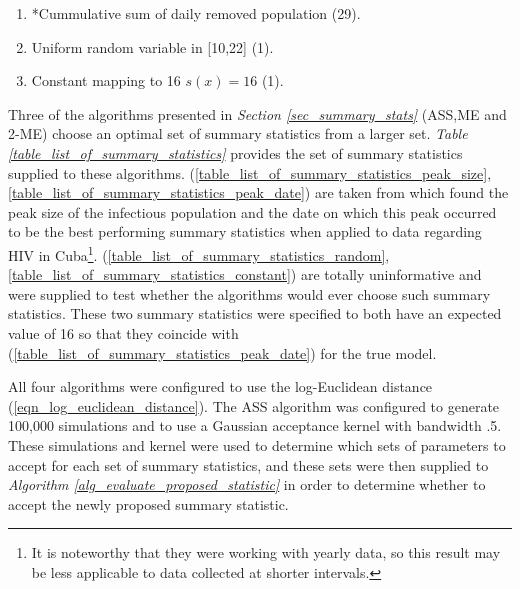 \documentclass[11pt,a4paper]{article}
\theoremstyle{break}
\begin{document}
\begin{table}[H]
\begin{framed}
{\begin{multicols}{2}
\begin{enumerate}[label=(S\arabic*)]
            \item *Cummulative sum of daily removed population (29).
            \item Uniform random variable in [10,22] (1).\label{table_list_of_summary_statistics_random}
            \item Constant mapping to 16 $s(x)=16$ (1).\label{table_list_of_summary_statistics_constant}
          \end{enumerate}
        \end{multicols}
      }
    \end{framed}
    \caption{Comprehensive set of 99 summary statistics supplied to the ASS, ME and 2-ME algorithms. An asterisk (*) denotes that a summary statistic of the natural logarithm of this value was supplied as well. In brackets is the dimensionality of each summary statistic when applied to the SIR-model depicted in \textit{Figure \ref{fig_example_standard_sir_model}} which runs for 30 time-periods.}
    \label{table_list_of_summary_statistics}
  \end{table}

  \par Three of the algorithms presented in \textit{Section \ref{sec_summary_stats}} (ASS,ME and 2-ME) choose an optimal set of summary statistics from a larger set. \textit{Table \ref{table_list_of_summary_statistics}} provides the set of summary statistics supplied to these algorithms. (\ref{table_list_of_summary_statistics_peak_size},\ref{table_list_of_summary_statistics_peak_date}) are taken from \cite[]{hiv_with_contact_tracing} which found the peak size of the infectious population and the date on which this peak occurred to be the best performing summary statistics when applied to data regarding HIV in Cuba\footnote{It is noteworthy that they were working with yearly data, so this result may be less applicable to data collected at shorter intervals.}. (\ref{table_list_of_summary_statistics_random},\ref{table_list_of_summary_statistics_constant}) are totally uninformative and were supplied to test whether the algorithms would ever choose such summary statistics. These two summary statistics were specified to both have an expected value of 16 so that they coincide with (\ref{table_list_of_summary_statistics_peak_date}) for the true model.

  \par All four algorithms were configured to use the log-Euclidean distance (\ref{eqn_log_euclidean_distance}). The ASS algorithm was configured to generate 100,000 simulations and to use a Gaussian acceptance kernel with bandwidth .5. These simulations and kernel were used to determine which sets of parameters to accept for each set of summary statistics, and these sets were then supplied to \textit{Algorithm \ref{alg_evaluate_proposed_statistic}} in order to determine whether to accept the newly proposed summary statistic.
\end{document}
